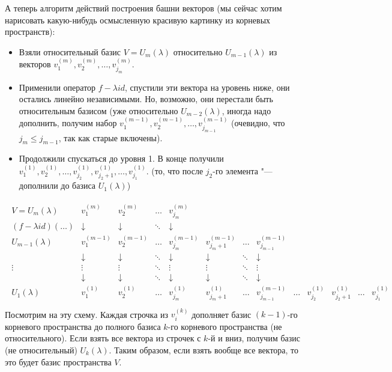 А теперь алгоритм действий построения башни векторов (мы сейчас хотим нарисовать какую-нибудь осмысленную красивую картинку из корневых пространств):
\begin{itemize}
\item
	Взяли относительный базис $V=U_m(\lambda)$ относительно $U_{m-1}(\lambda)$ из векторов
	$v_1^{(m)}, v_2^{(m)}, \dots, v_{j_m}^{(m)}$.
\item
	Применили оператор $f - \lambda id$, спустили эти вектора на уровень ниже, они остались линейно независимыми.
	Но, возможно, они перестали быть относительным базисом (уже относительно $U_{m-2}(\lambda)$, иногда надо дополнить, получим набор
	$v_1^{(m-1)}, v_2^{(m-1)}, \dots, v_{j_{m-1}}^{(m-1)}$
	(очевидно, что $j_m \le j_{m-1}$, так как старые включены).
\item
	Продолжили спускаться до уровня 1.
	В конце получили $v_1^{(1)}, v_2^{(1)}, \dots, v_{j_{2}}^{(1)}, v_{j_{2}+1}^{(1)}, \dots, v_{j_{1}}^{(1)}$.
	(то, что после $j_2$-го элемента "--- дополнили до базиса $U_1(\lambda)$)
\end{itemize}
\begin{gather*}
\begin{array}{r|cccccccccccc}
V=U_m(\lambda)        & v_1^{(m)}   & v_2^{(m)}   & \dots & v_{j_m}^{(m)}   \\
(f-\lambda id)(\dots) & \downarrow  & \downarrow  & \ddots& \downarrow      \\
U_{m-1}(\lambda)      & v_1^{(m-1)} & v_2^{(m-1)} & \dots & v_{j_m}^{(m-1)} & v_{j_m+1}^{(m-1)} & \dots  & v_{j_{m-1}}^{(m-1)} \\
                      & \downarrow  & \downarrow  & \ddots& \downarrow      & \downarrow        & \ddots & \downarrow          \\
\vdots                & \vdots      & \vdots      & \ddots& \vdots          & \vdots            & \ddots & \vdots              \\
                      & \downarrow  & \downarrow  & \ddots& \downarrow      & \downarrow        & \ddots & \downarrow          \\
U_{1}  (\lambda)      & v_1^{(1)}   & v_2^{(1)}   & \dots & v_{j_m}^{(1)}   & v_{j_m+1}^{(1)}   & \dots  & v_{j_{m-1}}^{(m-1)} & \dots & v_{j_2}^{(1)} & v_{j_2+1}^{(1)} & \dots & v_{j_1}^{(1)} \\
\end{array}
\end{gather*}
Посмотрим на эту схему.
Каждая строчка из $v_i^{(k)}$ дополняет базис $(k-1)$-го корневого пространства
до полного базиса $k$-го корневого пространства (не относительного).
Если взять все вектора из строчек с $k$-й и вниз, получим базис (не относительный) $U_k(\lambda)$.
Таким образом, если взять вообще все вектора, то это будет базис пространства $V$.

